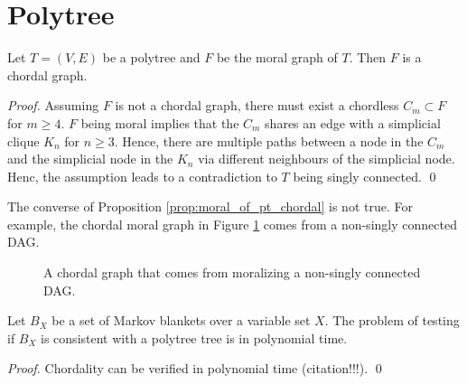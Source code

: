 \section{Polytree}
\begin{proposition}
\label{prop:moral_of_pt_chordal}
Let $T=(V,E)$ be a polytree and $F$ be the moral graph of $T$. Then $F$ is a chordal graph. 
\end{proposition}
\begin{proof}
Assuming $F$ is not a chordal graph, there must exist a chordless $C_m \subset F$ for $m\ge 4$. $F$ being moral implies that the $C_m$ shares an edge with a simplicial clique $K_n$ for $n \ge 3$. Hence, there are multiple paths between a node in the $C_m$ and the simplicial node in the $K_n$ via different neighbours of the simplicial node. Henc, the assumption leads to a contradiction to $T$ being singly connected. \qed
\end{proof}

The converse of Proposition \ref{prop:moral_of_pt_chordal} is not true. For example, the chordal moral graph in Figure \ref{fg:chordal_over_4nodes} comes from a non-singly connected DAG. 
\begin{figure}[H]
\centering
{}
\caption{A chordal graph that comes from moralizing a non-singly connected DAG.}
\label{fg:chordal_over_4nodes}
\end{figure}

\begin{corollary}
Let $B_X$ be a set of Markov blankets over a variable set $X$. The problem of testing if $B_X$ is consistent with a polytree tree is in polynomial time.
\end{corollary}
\begin{proof}
Chordality can be verified in polynomial time (citation!!!). \qed
\end{proof}

